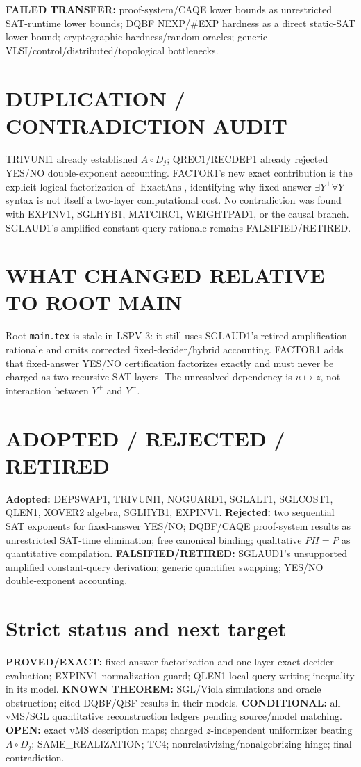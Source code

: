 \documentclass[11pt]{article}
\begin{document}
\textbf{FAILED TRANSFER:} proof-system/CAQE lower bounds as unrestricted SAT-runtime lower bounds; DQBF NEXP/\#EXP hardness as a direct static-SAT lower bound; cryptographic hardness/random oracles; generic VLSI/control/distributed/topological bottlenecks.

\section*{DUPLICATION / CONTRADICTION AUDIT}
TRIVUNI1 already established \(A\circ D_j\); QREC1/RECDEP1 already rejected YES/NO double-exponent accounting. FACTOR1's new exact contribution is the explicit logical factorization of \(\operatorname{ExactAns}\), identifying why fixed-answer \(\exists Y^+\forall Y^-\) syntax is not itself a two-layer computational cost. No contradiction was found with EXPINV1, SGLHYB1, MATCIRC1, WEIGHTPAD1, or the causal branch. SGLAUD1's amplified constant-query rationale remains FALSIFIED/RETIRED.

\section*{WHAT CHANGED RELATIVE TO ROOT MAIN}
Root \texttt{main.tex} is stale in LSPV-3: it still uses SGLAUD1's retired amplification rationale and omits corrected fixed-decider/hybrid accounting. FACTOR1 adds that fixed-answer YES/NO certification factorizes exactly and must never be charged as two recursive SAT layers. The unresolved dependency is \(u\mapsto z\), not interaction between \(Y^+\) and \(Y^-\).

\section*{ADOPTED / REJECTED / RETIRED}
\textbf{Adopted:} DEPSWAP1, TRIVUNI1, NOGUARD1, SGLALT1, SGLCOST1, QLEN1, XOVER2 algebra, SGLHYB1, EXPINV1.
\textbf{Rejected:} two sequential SAT exponents for fixed-answer YES/NO; DQBF/CAQE proof-system results as unrestricted SAT-time elimination; free canonical binding; qualitative \(PH=P\) as quantitative compilation.
\textbf{FALSIFIED/RETIRED:} SGLAUD1's unsupported amplified constant-query derivation; generic quantifier swapping; YES/NO double-exponent accounting.

\section*{Strict status and next target}
\textbf{PROVED/EXACT:} fixed-answer factorization and one-layer exact-decider evaluation; EXPINV1 normalization guard; QLEN1 local query-writing inequality in its model.
\textbf{KNOWN THEOREM:} SGL/Viola simulations and oracle obstruction; cited DQBF/QBF results in their models.
\textbf{CONDITIONAL:} all vMS/SGL quantitative reconstruction ledgers pending source/model matching.
\textbf{OPEN:} exact vMS description maps; charged \(z\)-independent uniformizer beating \(A\circ D_j\); SAME\_REALIZATION; TC4; nonrelativizing/nonalgebrizing hinge; final contradiction.
\end{document}
